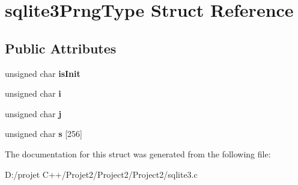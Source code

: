\hypertarget{structsqlite3_prng_type}{}\section{sqlite3\+Prng\+Type Struct Reference}
\label{structsqlite3_prng_type}
\subsection*{Public Attributes}
\begin{DoxyCompactItemize}
\item 
\mbox{\label{structsqlite3_prng_type_aca688d095b7505208c1f2a78e04c4f05}} 
unsigned char {\bfseries is\+Init}
\item 
\mbox{\label{structsqlite3_prng_type_af5bbbc5d1cf9f4ef337781adda96f8d5}} 
unsigned char {\bfseries i}
\item 
\mbox{\label{structsqlite3_prng_type_af26dbd92b84629c51ba3e2903ac8947a}} 
unsigned char {\bfseries j}
\item 
\mbox{\label{structsqlite3_prng_type_a0aea170de6a561014ee5f3d9020240b7}} 
unsigned char {\bfseries s} \mbox{[}256\mbox{]}
\end{DoxyCompactItemize}


The documentation for this struct was generated from the following file\+:\begin{DoxyCompactItemize}
\item 
D\+:/projet C++/\+Projet2/\+Project2/\+Project2/sqlite3.\+c\end{DoxyCompactItemize}
